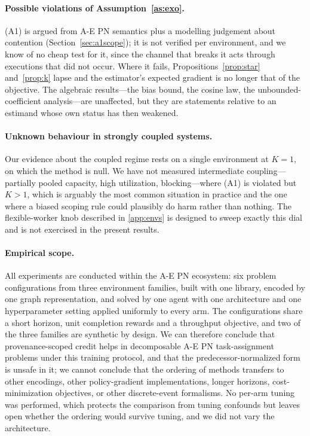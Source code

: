 \documentclass[review,authoryear,3p,times]{elsarticle}
\begin{document}
\paragraph{Possible violations of Assumption~\ref{as:exo}.} (A1) is argued from
A-E PN semantics plus a modelling judgement about contention
(Section~\ref{sec:a1scope}); it is not verified per environment, and we know of
no cheap test for it, since the channel that breaks it acts through executions
that did not occur. Where it fails, Propositions~\ref{prop:star}
and~\ref{prop:k} lapse and the estimator's expected gradient is no longer that
of the objective. The algebraic results---the bias bound, the cosine law, the
unbounded-coefficient analysis---are unaffected, but they are statements
relative to an estimand whose own status has then weakened.

\paragraph{Unknown behaviour in strongly coupled systems.} Our evidence about
the coupled regime rests on a single environment at $K=1$, on which the method
is null. We have not measured intermediate coupling---partially pooled capacity,
high utilization, blocking---where (A1) is violated but $K>1$, which is arguably
the most common situation in practice and the one where a biased scoping rule
could plausibly do harm rather than nothing. The flexible-worker knob described
in \ref{app:envs} is designed to sweep exactly this dial and is not
exercised in the present results.

\paragraph{Empirical scope.} All experiments are conducted within the A-E PN
ecosystem: six problem configurations from three environment families, built
with one library, encoded by one graph representation, and solved by one agent
with one architecture and one hyperparameter setting applied uniformly to every
arm. The configurations share a short horizon, unit completion rewards and a
throughput objective, and two of the three families are synthetic by design. We
can therefore conclude that provenance-scoped credit helps in decomposable A-E
PN task-assignment problems under this training protocol, and that the
predecessor-normalized form is unsafe in it; we cannot conclude that the
ordering of methods transfers to other encodings, other policy-gradient
implementations, longer horizons, cost-minimization objectives, or other
discrete-event formalisms. No per-arm tuning was performed, which protects the
comparison from tuning confounds but leaves open whether the ordering would
survive tuning, and we did not vary the architecture.
\end{document}
